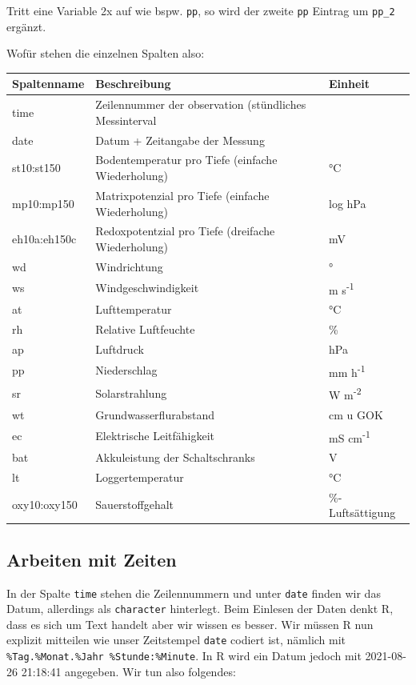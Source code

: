 \documentclass[
]{article}
\begin{document}
Tritt eine Variable 2x auf wie bspw. \texttt{pp}, so wird der zweite \texttt{pp} Eintrag um \texttt{pp\_2} ergänzt.

Wofür stehen die einzelnen Spalten also:

\begin{longtable}[]{@{}lll@{}}
\toprule
Spaltenname & Beschreibung & Einheit \\
\midrule
\endhead
time & Zeilennummer der observation (stündliches Messinterval & \\
date & Datum + Zeitangabe der Messung & \\
st10:st150 & Bodentemperatur pro Tiefe (einfache Wiederholung) & °C \\
mp10:mp150 & Matrixpotenzial pro Tiefe (einfache Wiederholung) & log hPa \\
eh10a:eh150c & Redoxpotentzial pro Tiefe (dreifache Wiederholung) & mV \\
wd & Windrichtung & ° \\
ws & Windgeschwindigkeit & m s\textsuperscript{-1} \\
at & Lufttemperatur & °C \\
rh & Relative Luftfeuchte & \% \\
ap & Luftdruck & hPa \\
pp & Niederschlag & mm h\textsuperscript{-1} \\
sr & Solarstrahlung & W m\textsuperscript{-2} \\
wt & Grundwasserflurabstand & cm u GOK \\
ec & Elektrische Leitfähigkeit & mS cm\textsuperscript{-1} \\
bat & Akkuleistung der Schaltschranks & V \\
lt & Loggertemperatur & °C \\
oxy10:oxy150 & Sauerstoffgehalt & \%-Luftsättigung \\
\bottomrule
\end{longtable}

\hypertarget{arbeiten-mit-zeiten}{%
\subsection{Arbeiten mit Zeiten}\label{arbeiten-mit-zeiten}}

In der Spalte \texttt{time} stehen die Zeilennummern und unter \texttt{date} finden wir das Datum, allerdings als \texttt{character} hinterlegt. Beim Einlesen der Daten denkt R, dass es sich um Text handelt aber wir wissen es besser. Wir müssen R nun explizit mitteilen wie unser Zeitstempel \texttt{date} codiert ist, nämlich mit \texttt{\%Tag.\%Monat.\%Jahr\ \%Stunde:\%Minute}. In R wird ein Datum jedoch mit 2021-08-26 21:18:41 angegeben. Wir tun also folgendes:
\end{document}
